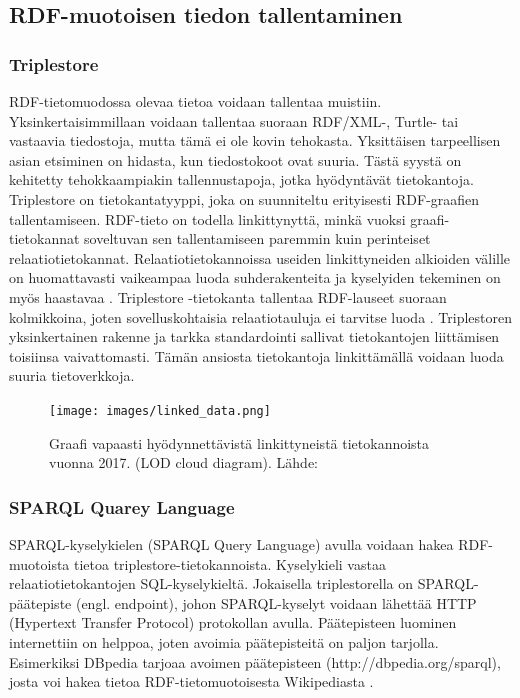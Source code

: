 \documentclass[finnish, 12pt, a4paper, elec, utf8, pdfa, online]{aaltothesis}
\begin{document}
{\subsection{RDF-muotoisen tiedon tallentaminen}


\subsubsection{Triplestore}
RDF-tietomuodossa olevaa tietoa voidaan tallentaa muistiin. Yksinkertaisimmillaan voidaan tallentaa suoraan RDF/XML-, Turtle- tai vastaavia tiedostoja, mutta tämä ei ole kovin tehokasta. Yksittäisen tarpeellisen asian etsiminen on hidasta, kun tiedostokoot ovat suuria. Tästä syystä on kehitetty tehokkaampiakin tallennustapoja, jotka hyödyntävät tietokantoja. Triplestore on tietokantatyyppi, joka on suunniteltu erityisesti RDF-graafien tallentamiseen. RDF-tieto on todella linkittynyttä, minkä vuoksi graafi-tietokannat soveltuvan sen tallentamiseen paremmin kuin perinteiset relaatiotietokannat. Relaatiotietokannoissa useiden linkittyneiden alkioiden välille on huomattavasti vaikeampaa luoda suhderakenteita ja kyselyiden tekeminen on myös haastavaa \cite{triplestore2}. Triplestore -tietokanta tallentaa RDF-lauseet suoraan kolmikkoina, joten sovelluskohtaisia relaatiotauluja ei tarvitse luoda \cite{triplestore}. Triplestoren yksinkertainen rakenne ja tarkka standardointi sallivat tietokantojen liittämisen toisiinsa vaivattomasti. Tämän ansiosta tietokantoja linkittämällä voidaan luoda suuria tietoverkkoja.


\begin{figure}[htb]
\centering
\texttt{[image: images/linked\_data.png]}
\caption{Graafi vapaasti hyödynnettävistä linkittyneistä tietokannoista vuonna 2017. (LOD cloud diagram). Lähde: \cite{LOD_cloud} \label{images/linked_data}}
\end{figure}

\subsubsection{SPARQL Quarey Language}
SPARQL-kyselykielen (SPARQL Query Language) avulla voidaan hakea RDF-muotoista tietoa triplestore-tietokannoista. Kyselykieli vastaa relaatiotietokantojen SQL-kyselykieltä. Jokaisella triplestorella on SPARQL-päätepiste (engl. endpoint), johon SPARQL-kyselyt voidaan lähettää HTTP (Hypertext Transfer Protocol) protokollan avulla. Päätepisteen luominen internettiin on helppoa, joten avoimia päätepisteitä on paljon tarjolla. Esimerkiksi DBpedia tarjoaa avoimen päätepisteen (http://dbpedia.org/sparql), josta voi hakea tietoa RDF-tietomuotoisesta Wikipediasta \cite{Antoniou}.

}
\end{document}
